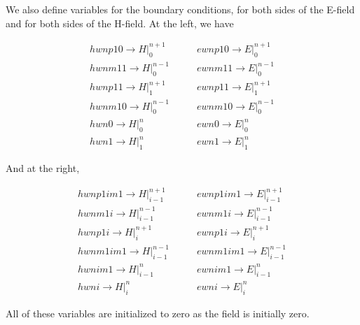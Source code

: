 \documentclass{article}
\begin{document}
    We also define variables for the boundary conditions, for both sides of
the E-field and for both sides of the H-field. At the left, we have

\begin{align}
hwnp10 \rightarrow H \Big |^{n+1} _{0}  &\qquad ewnp10 \rightarrow E |^{n+1} _{0}
\\
hwnm11 \rightarrow H \Big |^{n-1} _{0}  &\qquad ewnm11 \rightarrow E |^{n-1} _{0}
\\
hwnp11 \rightarrow H \Big |^{n+1} _{1}  &\qquad ewnp11 \rightarrow E |^{n+1} _{1}
\\
hwnm10 \rightarrow H \Big |^{n-1} _{0} &\qquad ewnm10 \rightarrow E |^{n-1} _{0}
\\
hwn0 \rightarrow H \Big |^{n} _{0} &\qquad ewn0  \rightarrow E |^{n} _{0}
\\
hwn1 \rightarrow H \Big |^{n} _{1} &\qquad ewn1 \rightarrow E |^{n} _{1}
\end{align}

And at the right,

\begin{align}
hwnp1im1 \rightarrow H \Big |^{n+1} _{i-1}  &\qquad ewnp1im1 \rightarrow E |^{n+1} _{i-1}
\\
hwnm1i \rightarrow H \Big |^{n-1} _{i-1}  &\qquad ewnm1i \rightarrow E |^{n-1} _{i-1}
\\
hwnp1i \rightarrow H \Big |^{n+1} _{i}  &\qquad ewnp1i \rightarrow E |^{n+1} _{i}
\\
hwnm1im1 \rightarrow H \Big |^{n-1} _{i-1} &\qquad ewnm1im1 \rightarrow E |^{n-1} _{i-1}
\\
hwnim1 \rightarrow H \Big |^{n} _{i-1} &\qquad ewnim1  \rightarrow E |^{n} _{i-1}
\\
hwni \rightarrow H \Big |^{n} _{i} &\qquad ewni \rightarrow E |^{n} _{i}
\end{align}

All of these variables are initialized to zero as the field is initially
zero.
\end{document}
